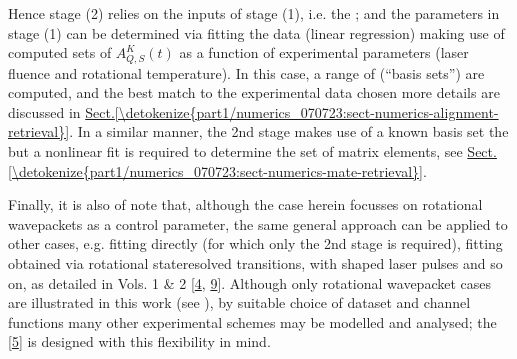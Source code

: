 \documentclass[letterpaper,table,10pt,english]{jupyterBook}
\begin{document}
\sphinxAtStartPar
Hence stage (2) relies on the inputs of stage (1), i.e. the {\hyperref[\detokenize{backmatter/glossary:term-ADMs}]{}}; and the parameters in stage (1) can be determined via fitting the data (linear regression) making use of computed sets of \(A_{Q,S}^{K}(t)\) as a function of experimental parameters (laser fluence and rotational temperature). In this case, a range of {\hyperref[\detokenize{backmatter/glossary:term-ADMs}]{}} (“basis sets”) are computed, and the best match to the experimental data chosen \sphinxhyphen{} more details are discussed in \hyperref[\detokenize{part1/numerics_070723:sect-numerics-alignment-retrieval}]{Sect.\@ \ref{\detokenize{part1/numerics_070723:sect-numerics-alignment-retrieval}}}. In a similar manner, the 2nd stage makes use of a known basis set \sphinxhyphen{} the {\hyperref[\detokenize{backmatter/glossary:term-channel-functions}]{}} \sphinxhyphen{} but a non\sphinxhyphen{}linear fit is required to determine the set of matrix elements, see \hyperref[\detokenize{part1/numerics_070723:sect-numerics-mate-retrieval}]{Sect.\@ \ref{\detokenize{part1/numerics_070723:sect-numerics-mate-retrieval}}}.

\sphinxAtStartPar
Finally, it is also of note that, although the case herein focusses on rotational wavepackets as a control parameter, the same general approach can be applied to other cases, e.g. fitting {\hyperref[\detokenize{backmatter/glossary:term-MF}]{}} directly (for which only the 2nd stage is required), fitting {\hyperref[\detokenize{backmatter/glossary:term-PADs}]{}} obtained via rotational state\sphinxhyphen{}resolved transitions, with shaped laser pulses and so on, as detailed in  Vols. 1 \& 2 {[}\hyperlink{cite.backmatter/bibliography:id677}{4}, \hyperlink{cite.backmatter/bibliography:id678}{9}{]}. Although only rotational wavepacket cases are illustrated in this work (see {\hyperref[\detokenize{part2/extracting_matrix_elements_overview_270423:chpt-extracting-matrix-elements-overview}]{}}), by suitable choice of dataset and channel functions many other experimental schemes may be modelled and analysed; the  {[}\hyperlink{cite.backmatter/bibliography:id682}{5}{]} is designed with  this flexibility in mind.
\end{document}
